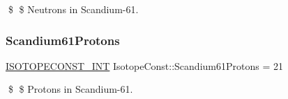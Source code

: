 \$ \$ Neutrons in Scandium-\/61. \mbox{\label{group___isotope_const-_scandium-_sc61_ga0e2af0cd8f75fbd1a98f882e19ab2bc1}} 
\subsubsection{\texorpdfstring{Scandium61\+Protons}{Scandium61Protons}}
{\footnotesize\ttfamily \mbox{\hyperlink{group___isotope_const-_macros_ga5f18360b3e99483a35c32d789e62621c}{I\+S\+O\+T\+O\+P\+E\+C\+O\+N\+S\+T\+\_\+\+I\+NT}} Isotope\+Const\+::\+Scandium61\+Protons = 21}

\$ \$ Protons in Scandium-\/61. 